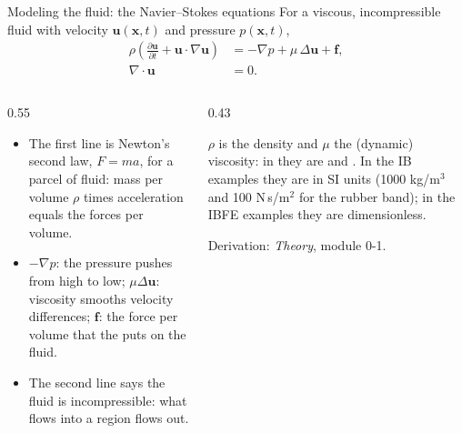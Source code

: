 \documentclass[aspectratio=169,11pt]{beamer}
\begin{document}
\begin{frame}{Modeling the fluid: the Navier--Stokes equations}
For a viscous, incompressible fluid with velocity $\mathbf{u}(\mathbf{x},t)$ and pressure $p(\mathbf{x},t)$,
\begin{align*}
\rho\left(\frac{\partial \mathbf{u}}{\partial t} + \mathbf{u}\cdot\nabla\mathbf{u}\right) &= -\nabla p + \mu\,\Delta\mathbf{u} + \mathbf{f}, \\
\nabla\cdot\mathbf{u} &= 0 .
\end{align*}
\begin{columns}[T,onlytextwidth]
\begin{column}{0.55\textwidth}
\small
\begin{itemize}
  \item The first line is Newton's second law, $F = ma$, for a parcel of fluid: mass per volume $\rho$ times acceleration equals the forces per volume.
  \item $-\nabla p$: the pressure pushes from high to low; $\mu\Delta\mathbf{u}$: viscosity smooths velocity differences; $\mathbf{f}$: the force per volume that the  puts on the fluid.
  \item The second line says the fluid is incompressible: what flows into a region flows out.
\end{itemize}
\end{column}
\begin{column}{0.43\textwidth}
\begin{punchbox}
\small $\rho$ is the density and $\mu$ the (dynamic) viscosity: in  they are  and . In the IB examples they are in SI units (1000 kg/m$^3$ and 100 N\,s/m$^2$ for the rubber band); in the IBFE examples they are dimensionless.
\end{punchbox}
\vspace{1mm}
\small Derivation: \emph{Theory}, module 0-1.
\end{column}
\end{columns}
\end{frame}
\end{document}
